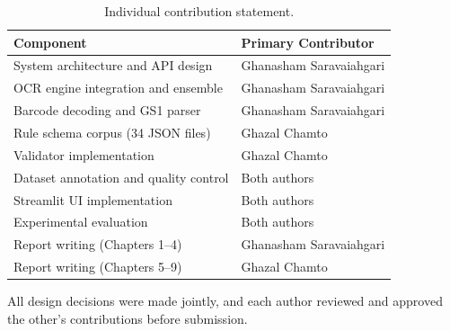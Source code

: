 \begin{table}[h]
\centering
\begin{tabular}{ll}
\toprule
\textbf{Component} & \textbf{Primary Contributor} \\
\midrule
System architecture and API design & Ghanasham Saravaiahgari \\
OCR engine integration and ensemble & Ghanasham Saravaiahgari \\
Barcode decoding and GS1 parser & Ghanasham Saravaiahgari \\
Rule schema corpus (34 JSON files) & Ghazal Chamto \\
Validator implementation & Ghazal Chamto \\
Dataset annotation and quality control & Both authors \\
Streamlit UI implementation & Both authors \\
Experimental evaluation & Both authors \\
Report writing (Chapters 1--4) & Ghanasham Saravaiahgari \\
Report writing (Chapters 5--9) & Ghazal Chamto \\
\bottomrule
\end{tabular}
\caption{Individual contribution statement.}
\end{table}

All design decisions were made jointly, and each author reviewed and approved the
other's contributions before submission.
